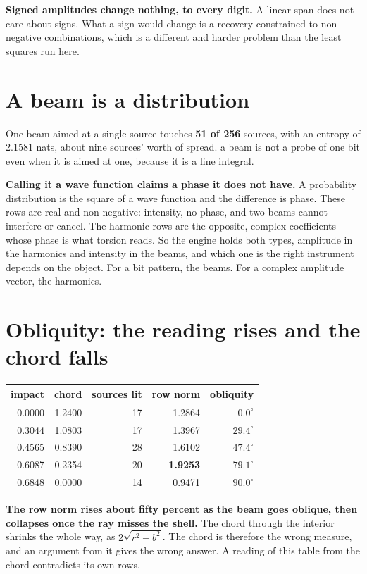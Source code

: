 \textbf{Signed amplitudes change nothing, to every digit.} A linear span does not care about signs.
What a sign would change is a recovery constrained to non-negative combinations, which is a different
and harder problem than the least squares run here.

\section{A beam is a distribution}

One beam aimed at a single source touches \textbf{51 of 256} sources, with an entropy of 2.1581 nats,
about nine sources' worth of spread. a beam is not a probe of one bit even when it is aimed at one,
because it is a line integral.

\textbf{Calling it a wave function claims a phase it does not have.} A probability distribution is the
square of a wave function and the difference is phase. These rows are real and non-negative:
intensity, no phase, and two beams cannot interfere or cancel. The harmonic rows are the opposite,
complex coefficients whose phase is what torsion reads. So the engine holds both types, amplitude in
the harmonics and intensity in the beams, and which one is the right instrument depends on the object.
For a bit pattern, the beams. For a complex amplitude vector, the harmonics.

\section{Obliquity: the reading rises and the chord falls}

\begin{center}
\begin{tabular}{@{}rrrrr@{}}
\toprule
impact & chord & sources lit & row norm & obliquity \\
\midrule
0.0000 & 1.2400 & 17 & 1.2864 & \(0.0^\circ\) \\
0.3044 & 1.0803 & 17 & 1.3967 & \(29.4^\circ\) \\
0.4565 & 0.8390 & 28 & 1.6102 & \(47.4^\circ\) \\
0.6087 & 0.2354 & 20 & \textbf{1.9253} & \(79.1^\circ\) \\
0.6848 & 0.0000 & 14 & 0.9471 & \(90.0^\circ\) \\
\bottomrule
\end{tabular}
\end{center}

\textbf{The row norm rises about fifty percent as the beam goes oblique, then collapses once the ray
misses the shell.} The chord through the interior shrinks the whole way, as
\(2\sqrt{r^2 - b^2}\). The chord is therefore the wrong measure, and an argument from it gives the wrong answer.
A reading of this table from the chord contradicts its own rows.

